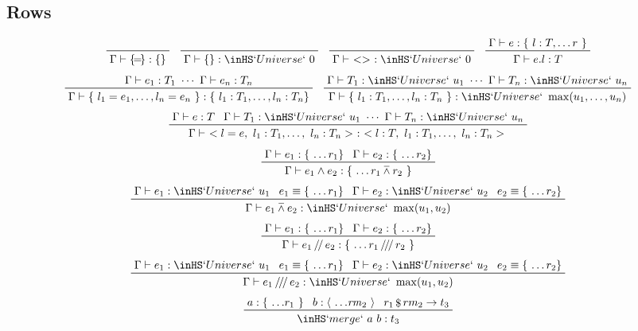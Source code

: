 \documentclass[11pt, twoside, reqno]{book}
\providecommand{\wedgeonwedge}{\barwedge}
\begin{document}
\begin{appdices}
\subsection{Rows}
\begin{displaymath}
\prftree{\Gamma \vdash \{\!=\!\} : \{\}}
\quad
\prftree{\Gamma \vdash \{\} : \inHS`Universe`\ 0}
\quad
\prftree{\Gamma \vdash\ <>\ : \inHS`Universe`\ 0}
\quad
\prftree{\Gamma \vdash e : \{\ l : T, \dots r\ \}}{\Gamma \vdash e.l : T}
\end{displaymath}
\begin{displaymath}
\prftree{\Gamma \vdash e_1 : T_1\ \cdots\ \Gamma \vdash e_n : T_n}{\Gamma \vdash \{\ l_1 = e_1, \dots, l_n = e_n\ \} : \{\ l_1 : T_1, \dots, l_n : T_n \}}
\quad
\prftree{\Gamma \vdash T_1 : \inHS`Universe`\ u_1\ \cdots\ \Gamma \vdash T_n : \inHS`Universe`\ u_n}{\Gamma \vdash \{\ l_1 : T_1, \dots, l_n : T_n\ \} : \inHS`Universe`\ \max(u_1, \dots, u_n)}
\end{displaymath}
\begin{displaymath}
\prftree{\Gamma \vdash e : T}{\Gamma \vdash T_1 : \inHS`Universe`\ u_1\ \cdots\ \Gamma \vdash T_n : \inHS`Universe`\ u_n}{\Gamma \vdash\ < l = e,\ l_1 : T_1, \dots,\ l_n : T_n >\ :\ < l : T,\ l_1 : T_1, \dots,\ l_n : T_n >}
\end{displaymath}
\begin{displaymath}
\prftree{\Gamma \vdash e_1 : \{\ \dots r_1 \}}{\Gamma \vdash e_2 : \{\ \dots r_2 \}}{\Gamma \vdash e_1 \land e_2 : \{\ \dots r_1 \wedgeonwedge r_2\ \}}
\end{displaymath}
\begin{displaymath}
\prftree{\Gamma \vdash e_1 : \inHS`Universe`\ u_1}{e_1 \equiv \{\ \dots r_1 \}}{\Gamma \vdash e_2 : \inHS`Universe`\ u_2}{e_2 \equiv \{\ \dots r_2 \}}{\Gamma \vdash e_1 \wedgeonwedge e_2 : \inHS`Universe`\ \max(u_1, u_2)}
\end{displaymath}
\begin{displaymath}
\prftree{\Gamma \vdash e_1 : \{\ \dots r_1 \}}{\Gamma \vdash e_2 : \{\ \dots r_2 \}}{\Gamma \vdash e_1 \mathop{/\!/} e_2 : \{\ \dots r_1 \mathop{/\!/\!/} r_2\ \}}
\end{displaymath}
\begin{displaymath}
\prftree{\Gamma \vdash e_1 : \inHS`Universe`\ u_1}{e_1 \equiv \{\ \dots r_1 \}}{\Gamma \vdash e_2 : \inHS`Universe`\ u_2}{e_2 \equiv \{\ \dots r_2 \}}{\Gamma \vdash e_1 \mathop{/\!/\!/} e_2 : \inHS`Universe`\ \max(u_1, u_2)}
\end{displaymath}
\begin{displaymath}
\prftree{a : \{\ \dots\!r_1\ \}}{b : \langle\ \dots\!\mathit{rm}_2\ \rangle}{r_1 \mathop{\$} rm_2 \to t_3}{\inHS`merge`\ a\ b : t_3}
\end{displaymath}



\end{appdices}
\end{document}
